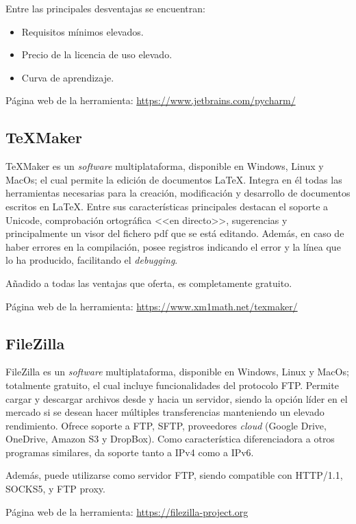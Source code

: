 Entre las principales desventajas se encuentran:
\begin{itemize}
\tightlist
\item Requisitos mínimos elevados. 
\item Precio de la licencia de uso elevado.
\item Curva de aprendizaje.
\end{itemize}

Página web de la herramienta: \url{https://www.jetbrains.com/pycharm/}

\subsection{\TeX Maker}
\TeX Maker es un \textit{software} multiplataforma, disponible en Windows, Linux y MacOs; el cual permite la edición de documentos \LaTeX. Integra en él todas las herramientas necesarias para la creación, modificación y desarrollo de documentos escritos en \LaTeX. Entre sus características principales destacan el soporte a Unicode, comprobación ortográfica <<en directo>>, sugerencias y principalmente un visor del fichero pdf que se está editando. Además, en caso de haber errores en la compilación, posee registros indicando el error y la línea que lo ha producido, facilitando el \textit{debugging}.

Añadido a todas las ventajas que oferta, es completamente gratuito.

Página web de la herramienta: \url{https://www.xm1math.net/texmaker/}

\subsection{FileZilla}
FileZilla es un \textit{software} multiplataforma, disponible en Windows, Linux y MacOs; totalmente gratuito, el cual incluye funcionalidades del protocolo FTP. Permite cargar y descargar archivos desde y hacia un servidor, siendo la opción líder en el mercado si se desean hacer múltiples transferencias manteniendo un elevado rendimiento. Ofrece soporte a FTP, SFTP, proveedores \textit{cloud} (Google Drive, OneDrive, Amazon S3 y DropBox). Como característica diferenciadora a otros programas similares, da soporte tanto a IPv4 como a IPv6. 

Además, puede utilizarse como servidor FTP, siendo compatible con HTTP/1.1, SOCKS5, y FTP proxy. 


Página web de la herramienta: \url{https://filezilla-project.org}

